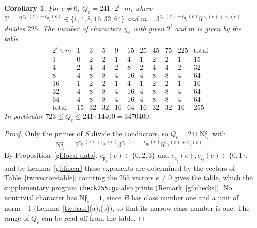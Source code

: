 \documentclass[11pt]{amsart}
\numberwithin{equation}{section}
\newtheorem{corollary}[equation]{Corollary}
\theoremstyle{definition}
\theoremstyle{remark}
\begin{document}
\begin{corollary}\label{gf:conductors}
For $e\ne0$, $Q_e=241\cdot2^i\cdot m$, where
$2^i=2^{c_{\mathfrak p_1}(e)+c_{\mathfrak p_2}(e)}\in\{1,4,8,16,32,64\}$ and
$m=3^{c_{\mathfrak q_1}(e)+c_{\mathfrak q_2}(e)}5^{c_{\mathfrak r_1}(e)+c_{\mathfrak r_2}(e)}$
divides $225$. The number of characters $\chi_e$ with given $2^i$ and $m$ is
given by the table
\begin{equation}\label{gf:conductor-table}
\begin{array}{c|ccccccccc|c}
 2^i\backslash m&1&3&5&9&15&25&45&75&225&\text{total}\\\hline
 1&0&2&2&1&4&1&2&2&1&15\\
 4&2&4&4&2&8&2&4&4&2&32\\
 8&4&8&8&4&16&4&8&8&4&64\\
 16&1&2&2&1&4&1&2&2&1&16\\
 32&4&8&8&4&16&4&8&8&4&64\\
 64&4&8&8&4&16&4&8&8&4&64\\\hline
 \text{total}&15&32&32&16&64&16&32&32&16&255
\end{array}
\end{equation}
In particular $723\le Q_e\le241\cdot14400=3470400$.
\end{corollary}

\begin{proof}
Only the primes of $S$ divide the conductors, so $Q_e=241\,\mathrm N\mathfrak f_e$
with
\[
 \mathrm N\mathfrak f_e=2^{c_{\mathfrak p_1}(e)+c_{\mathfrak
 p_2}(e)}3^{c_{\mathfrak q_1}(e)+c_{\mathfrak q_2}(e)}5^{c_{\mathfrak
 r_1}(e)+c_{\mathfrak r_2}(e)}.
\]
By Proposition~\ref{gf:local-data},
$c_{\mathfrak p_j}(e)\in\{0,2,3\}$ and
$c_{\mathfrak q_j}(e),c_{\mathfrak r_j}(e)\in\{0,1\}$, and by
Lemma~\ref{gf:linear} these exponents are determined by the vectors of
Table~\ref{tw:vector-table}; counting the $255$ vectors $e\ne0$ gives the
table, which the supplementary program \texttt{check255.gp} also prints
(Remark~\ref{gf:checks}). No nontrivial character has $\mathrm N\mathfrak f_e=1$,
since $B$ has class number one and a unit of norm $-1$
(Lemma~\ref{tw:base}(a),(b)), so that its narrow class number is one. The
range of $Q_e$ can be read off from the table.
\end{proof}
\end{document}
